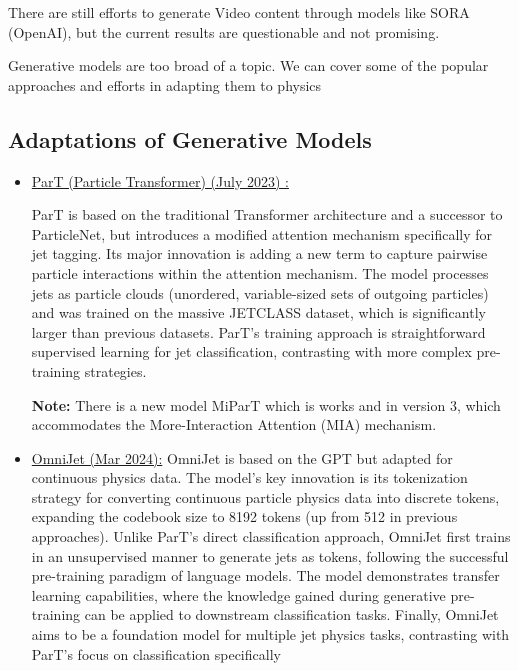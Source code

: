 \documentclass[letterpaper,12pt]{article}
\begin{document}
\begin{spacing}{1.125}
There are still efforts to generate Video content through models like SORA
(OpenAI), but the current results are questionable and not promising.

Generative models are too broad of a topic.
We can cover some of the popular approaches and
efforts in adapting them to physics

\subsection{Adaptations of Generative Models}

\begin{itemize}
  \item \href{https://arxiv.org/abs/2202.03772}{ParT (Particle Transformer)
    (July 2023) :}

ParT is based on the traditional Transformer architecture and a successor to ParticleNet, but introduces a modified
attention mechanism specifically for jet tagging. Its major innovation is adding a new term to capture pairwise particle
interactions within the attention mechanism. The model processes jets as particle clouds (unordered, variable-sized sets
of outgoing particles) and was trained on the massive JETCLASS dataset, which is significantly larger than previous
datasets. ParT's training approach is straightforward supervised learning for jet classification, contrasting with more
complex pre-training strategies.

\textbf{Note:} There is a new model MiParT which is works and in version 3, which accommodates the More-Interaction Attention
(MIA) mechanism.

\item \href{https://arxiv.org/abs/2403.05618}{OmniJet (Mar 2024):}
OmniJet is based on the GPT but adapted for continuous physics data. The model's key innovation is its tokenization
strategy for converting continuous particle physics data into discrete tokens, expanding the codebook size to 8192 tokens
(up from 512 in previous approaches). Unlike ParT's direct classification approach, OmniJet first trains in an unsupervised
manner to generate jets as tokens, following the successful pre-training paradigm of language models. The model
demonstrates transfer learning capabilities, where the knowledge gained during generative pre-training can be applied to
downstream classification tasks. Finally, OmniJet aims to be a foundation model for multiple jet physics tasks, contrasting
with ParT's focus on classification specifically
\end{itemize}


\end{spacing}
\end{document}
